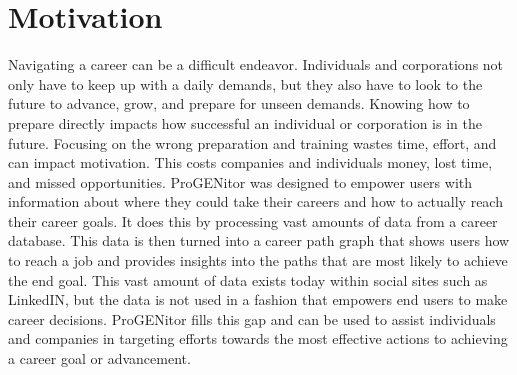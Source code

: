 \section{Motivation}
\label{sect:motivation}
Navigating a career can be a difficult endeavor.  Individuals and corporations
not only have to keep up with a daily demands, but they also have to look to the
future to advance, grow, and prepare for unseen demands.  Knowing how to prepare
directly impacts how successful an individual or corporation is in the future. 
Focusing on the wrong preparation and training wastes time, effort, and can
impact motivation.  This costs companies and individuals money, lost time, and
missed opportunities.  ProGENitor was designed to empower users with information
about where they could take their careers and how to actually reach their career
goals.  It does this by processing vast amounts of data from a career database. 
This data is then turned into a career path graph that shows users how to reach
a job and provides insights into the paths that are most likely to achieve the
end goal.  This vast amount of data exists today within social sites such as
LinkedIN, but the data is not used in a fashion that empowers end users to make
career decisions.  ProGENitor fills this gap and can be used to assist
individuals and companies in targeting efforts towards the most effective
actions to achieving a career goal or advancement.
